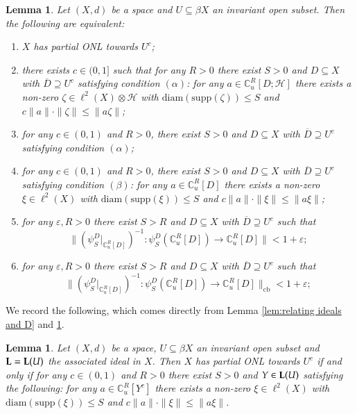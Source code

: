 \documentclass[12pt, a4paper]{amsart}
\numberwithin{equation}{section}
\newtheorem{lem}[thm]{Lemma}
\theoremstyle{definition}
\theoremstyle{remark}
\def\CC{\mathbb{C}}
\def\H{\mathcal{H}}
\def\L{\mathcal{L}}
\def\supp{\mathrm{supp}}
\def\diam{\mathrm{diam}}
\def\cb{\mathrm{cb}}
\def\L{{\bf L}}
\begin{document}
\begin{lem}\label{lem:char for partial ONL}
Let $(X,d)$ be a space and $U \subseteq \beta X$ an invariant open subset. Then the following are equivalent:
\begin{enumerate}
 \item $X$ has partial ONL towards $U^c$;
 \item there exists $c\in (0,1]$ such that for any $R>0$ there exist $S>0$ and $D \subseteq X$ with $\overline{D} \supseteq U^c$ satisfying condition $(\alpha)$: for any $a\in \CC^R_u[D;\H]$ there exists a non-zero $\zeta \in \ell^2(X) \otimes \H$ with $\diam(\supp(\zeta)) \leq S$ and $c\|a\| \cdot \|\zeta\| \leq \|a \zeta\|$;
 \item for any $c\in (0,1)$ and $R>0$, there exist $S>0$ and $D \subseteq X$ with $\overline{D} \supseteq U^c$ satisfying  condition $(\alpha)$;
 \item for any $c\in (0,1)$ and $R>0$, there exist $S>0$ and $D \subseteq X$ with $\overline{D} \supseteq U^c$ satisfying  condition $(\beta)$: for any $a \in \CC^R_u[D]$ there exists a non-zero $\xi \in \ell^2(X)$ with $\diam(\supp(\xi)) \leq S$ and $c\|a\| \cdot \|\xi\| \leq \|a \xi\|$;
 \item for any $\varepsilon, R>0$ there exist $S>R$ and $D \subseteq X$ with $\overline{D} \supseteq U^c$ such that
 \[
 \|(\psi_S^D|_{\CC^R_u[D]})^{-1}: \psi_S^D(\CC^R_u[D]) \longrightarrow \CC^R_u[D]\| < 1+\varepsilon;
 \]
 \item for any $\varepsilon, R>0$ there exist $S>R$ and $D \subseteq X$ with $\overline{D} \supseteq U^c$ such that
 \[
 \|(\psi_S^D|_{\CC^R_u[D]})^{-1}: \psi_S^D(\CC^R_u[D]) \longrightarrow \CC^R_u[D]\|_{\cb} < 1+\varepsilon;
 \]
\end{enumerate}
\end{lem}

We record the following, which comes directly from Lemma \ref{lem:relating ideals and D} and \ref{lem:char for partial ONL}.


\begin{lem}\label{lem:simple char for partial ONL}
Let $(X,d)$ be a space, $U \subseteq \beta X$ an invariant open subset and $\L=\L(U)$ the associated ideal in $X$. Then $X$ has partial ONL towards $U^c$ \emph{if and only if} for any $c \in (0,1)$ and $R>0$ there exist $S>0$ and $Y \in \L(U)$ satisfying the following: for any $a \in \CC^R_u[Y^c]$ there exists a non-zero $\xi \in \ell^2(X)$ with $\diam(\supp(\xi)) \leq S$ and $c\|a\| \cdot \|\xi\| \leq \|a \xi\|$.
\end{lem}
\end{document}
